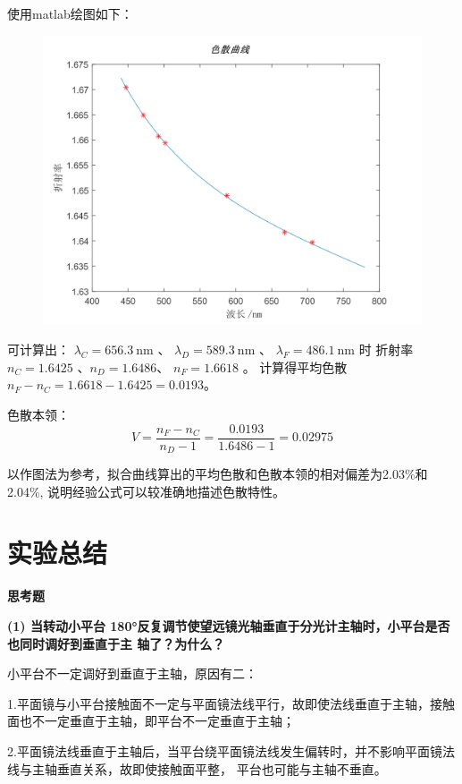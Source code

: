 \documentclass[UTF8]{ctexart}
\begin{document}
使用matlab绘图如下：

\begin{figure}[H]
    \centering
    \includegraphics[scale=0.8]{色散曲线.png}
\end{figure}

可计算出：  $\lambda_{C}=656.3 \mathrm{~nm}$ 、 $\lambda_{D}=589.3 \mathrm{~nm}$ 、 $\lambda_{F}=486.1 \mathrm{~nm} $ 时
折射率  $n_{C}=1.6425$ 、$ n_{D}=1.6486 $、 $n_{F}=1.6618$  。 
计算得平均色散$n_{F}-n_{C}=1.6618-1.6425=0.0193$。

色散本领：
$$
V=\frac{n_{F}-n_{C}}{n_{D}-1}=\frac{0.0193}{1.6486-1}=0.02975
$$

以作图法为参考，拟合曲线算出的平均色散和色散本领的相对偏差为2.03\%和2.04\%,
说明经验公式可以较准确地描述色散特性。

\section{实验总结}

\noindent \textbf{思考题}

\noindent  \textbf{(1) 当转动小平台 180°反复调节使望远镜光轴垂直于分光计主轴时，小平台是否也同时调好到垂直于主
轴了？为什么？}

小平台不一定调好到垂直于主轴，原因有二：

1.平面镜与小平台接触面不一定与平面镜法线平行，故即使法线垂直于主轴，接触面也不一定垂直于主轴，即平台不一定垂直于主轴；

2.平面镜法线垂直于主轴后，当平台绕平面镜法线发生偏转时，并不影响平面镜法线与主轴垂直关系，故即使接触面平整，
平台也可能与主轴不垂直。
\end{document}
